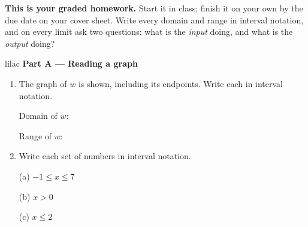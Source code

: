 \documentclass[10pt]{article}
\begin{document}

\vspace{0.12in}

\boxguard[8]
\begin{remindbox}
\small
\textbf{This is your graded homework.} Start it in class; finish it on your own by the due
date on your cover sheet. Write every domain and range in interval notation, and on every
limit ask two questions: what is the \emph{input} doing, and what is the \emph{output} doing?
\end{remindbox}

\vspace{0.12in}

\begin{headlinebox}{lilac}
\textbf{\color{plum}Part A --- Reading a graph}
\end{headlinebox}

\begin{minipage}[t]{0.44\linewidth}
\vspace{0pt}
\centering
{}
\end{minipage}\hfill
\begin{minipage}[t]{0.53\linewidth}
\vspace{0pt}
\begin{enumerate}[leftmargin=1.9em, itemsep=10pt]
\item The graph of $w$ is shown, including its endpoints. Write each in interval notation.

      Domain of $w$: \ans{$[-3,\ 5)$}

      Range of $w$: \ans{$[-2,\ 4\,]$}

\item Write each set of numbers in interval notation.

      (a) $-1 \le x \le 7$ \quad \ans{$[-1,\ 7\,]$}

      (b) $x > 0$ \quad {}

      (c) $x \le 2$ \quad \ans{$(-\infty,\ 2\,]$}
\end{enumerate}
\end{minipage}
\end{document}
